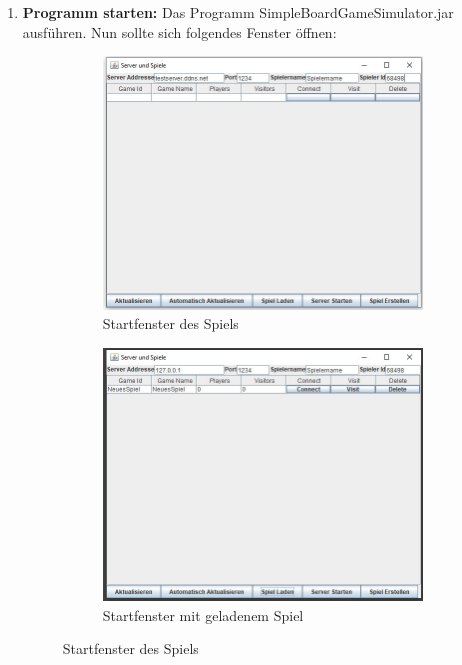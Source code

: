 \documentclass[ngerman]{scrbook}
\begin{document}
\begin{enumerate}[label=\arabic*)]
		\item \label{item:StartGame} \textbf{Programm starten:} Das Programm SimpleBoardGameSimulator.jar ausführen. Nun sollte sich folgendes Fenster öffnen:
		\begin{figure}[!h]
			\centering
			     \begin{subfigure}[b]{0.45\textwidth}
				\centering
				\includegraphics[width=\textwidth]{ServerLobbyWindow.jpg}
				\caption{Startfenster des Spiels}
				\label{fig:Start}
			\end{subfigure}
			\hfill
			\begin{subfigure}[b]{0.45\textwidth}
				\centering
				\includegraphics[width=\textwidth]{ServerLobbyWindowStartedGame.jpg}
				\caption{Startfenster mit geladenem Spiel}
				\label{fig:StartLoaded}
			\end{subfigure}
			\caption{Startfenster des Spiels}
		\end{figure}
	

\end{enumerate}
\end{document}
